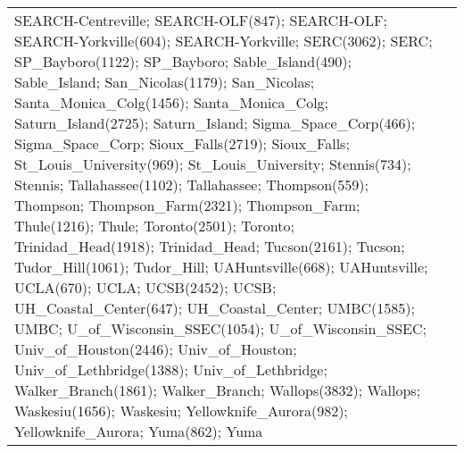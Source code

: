 \documentclass[journal abbreviation, manuscript]{copernicus}
\begin{document}
\begin{table}
\begin{tabularx}{\textwidth}{lX}
SEARCH-Centreville; SEARCH-OLF(847); SEARCH-OLF; SEARCH-Yorkville(604); SEARCH-Yorkville; SERC(3062); SERC; SP\_Bayboro(1122); SP\_Bayboro; Sable\_Island(490); Sable\_Island; San\_Nicolas(1179); San\_Nicolas; Santa\_Monica\_Colg(1456); Santa\_Monica\_Colg; Saturn\_Island(2725); Saturn\_Island; Sigma\_Space\_Corp(466); Sigma\_Space\_Corp; Sioux\_Falls(2719); Sioux\_Falls; St\_Louis\_University(969); St\_Louis\_University; Stennis(734); Stennis; Tallahassee(1102); Tallahassee; Thompson(559); Thompson; Thompson\_Farm(2321); Thompson\_Farm; Thule(1216); Thule; Toronto(2501); Toronto; Trinidad\_Head(1918); Trinidad\_Head; Tucson(2161); Tucson; Tudor\_Hill(1061); Tudor\_Hill; UAHuntsville(668); UAHuntsville; UCLA(670); UCLA; UCSB(2452); UCSB; UH\_Coastal\_Center(647); UH\_Coastal\_Center; UMBC(1585); UMBC; U\_of\_Wisconsin\_SSEC(1054); U\_of\_Wisconsin\_SSEC; Univ\_of\_Houston(2446); Univ\_of\_Houston; Univ\_of\_Lethbridge(1388); Univ\_of\_Lethbridge; Walker\_Branch(1861); Walker\_Branch; Wallops(3832); Wallops; Waskesiu(1656); Waskesiu; Yellowknife\_Aurora(982); Yellowknife\_Aurora; Yuma(862); Yuma \\

\end{tabularx}
\end{table}
\end{document}
